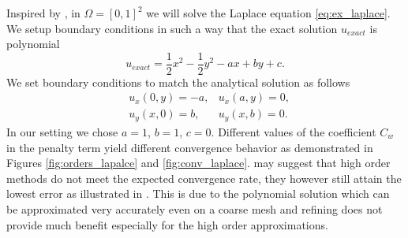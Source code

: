 \begin{example}[Diffusion 2D]
\label{ex:laplace}
Inspired by \cite[problem 8.4 (3), p. 150]{Holubova2011}, in $\Omega = [0, 1]^2$
we will solve the Laplace equation \eqref{eq:ex_laplace}.
We setup boundary conditions in such a way that the exact solution
$u_{exact}$ is polynomial
\begin{equation}
u_{exact} = \frac{1}{2}x^2 - \frac{1}{2}y^2 - ax + by + c.
\end{equation}
We set boundary conditions to match the analytical solution as follows
\begin{equation}
	\begin{aligned}
		&u_x(0, y) = -a, & u_x(a, y) = 0,\\
		&u_y(x, 0) = b, & u_y(x, b) = 0.
	\end{aligned}
\end{equation}
In our setting we chose $a=1$, $b=1$, $c=0$. Different values of
the coefficient $C_w$ in the penalty term yield different convergence behavior as demonstrated in
Figures \ref{fig:orders_lapalce} and \ref{fig:conv_laplace}. 
may suggest that high order methods do not meet the expected convergence rate, they however
still attain the lowest error as illustrated in . This is due to
the polynomial solution which can be approximated very accurately even on a coarse mesh and
refining does not provide much benefit especially for the high order approximations.
\end{example}

